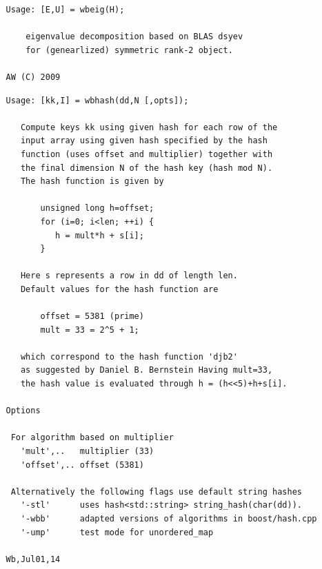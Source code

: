 \documentclass[twoside,12pt]{article}
\begin{document}
\pagebreak[3]



\begin{verbatim}
   Usage: [E,U] = wbeig(H);
 
       eigenvalue decomposition based on BLAS dsyev
       for (genearlized) symmetric rank-2 object.
 
   AW (C) 2009
\end{verbatim}

\pagebreak[3]



\begin{verbatim}
   Usage: [kk,I] = wbhash(dd,N [,opts]);
 
      Compute keys kk using given hash for each row of the
      input array using given hash specified by the hash
      function (uses offset and multiplier) together with
      the final dimension N of the hash key (hash mod N).
      The hash function is given by
 
          unsigned long h=offset;
          for (i=0; i<len; ++i) {
             h = mult*h + s[i];
          }
 
      Here s represents a row in dd of length len.
      Default values for the hash function are
 
          offset = 5381 (prime)
          mult = 33 = 2^5 + 1;
 
      which correspond to the hash function 'djb2'
      as suggested by Daniel B. Bernstein Having mult=33,
      the hash value is evaluated through h = (h<<5)+h+s[i].
 
   Options
 
    For algorithm based on multiplier
      'mult',..   multiplier (33)
      'offset',.. offset (5381)
 
    Alternatively the following flags use default string hashes
      '-stl'      uses hash<std::string> string_hash(char(dd)).
      '-wbb'      adapted versions of algorithms in boost/hash.cpp
      '-ump'      test mode for unordered_map
 
   Wb,Jul01,14
\end{verbatim}

\pagebreak[3]


\end{document}
